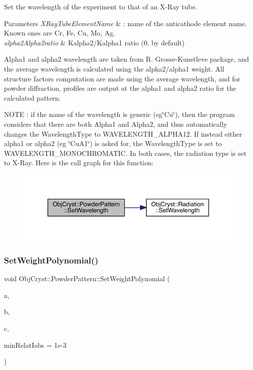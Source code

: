 Set the wavelength of the experiment to that of an X-\/\+Ray tube. 


\begin{DoxyParams}{Parameters}
{\em X\+Ray\+Tube\+Element\+Name} & \+: name of the anticathode element name. Known ones are Cr, Fe, Cu, Mo, Ag. \\
\hline
{\em alpha2\+Alpha2ratio} & Kalpha2/\+Kalpha1 ratio (0. by default)\\
\hline
\end{DoxyParams}
Alpha1 and alpha2 wavelength are taken from R. Grosse-\/\+Kunstleve package, and the average wavelength is calculated using the alpha2/alpha1 weight. All structure factors computation are made using the average wavelength, and for powder diffraction, profiles are output at the alpha1 and alpha2 ratio for the calculated pattern.

N\+O\+TE \+: if the name of the wavelength is generic (eg\char`\"{}\+Cu\char`\"{}), then the program considers that there are both Alpha1 and Alpha2, and thus automatically changes the Wavelength\+Type to W\+A\+V\+E\+L\+E\+N\+G\+T\+H\+\_\+\+A\+L\+P\+H\+A12. If instead either alpha1 or alpha2 (eg \char`\"{}\+Cu\+A1\char`\"{}) is asked for, the Wavelength\+Type is set to W\+A\+V\+E\+L\+E\+N\+G\+T\+H\+\_\+\+M\+O\+N\+O\+C\+H\+R\+O\+M\+A\+T\+IC. In both cases, the radiation type is set to X-\/\+Ray. Here is the call graph for this function\+:
\nopagebreak
\begin{figure}[H]
\begin{center}
\leavevmode
\includegraphics[width=345pt]{class_obj_cryst_1_1_powder_pattern_a9638b42f38dd82522593e1e01b6629c6_cgraph}
\end{center}
\end{figure}
\mbox{\label{class_obj_cryst_1_1_powder_pattern_a3648701bed1a9ba0b576241226e06032}} 
\subsubsection{\texorpdfstring{SetWeightPolynomial()}{SetWeightPolynomial()}}
{\footnotesize\ttfamily void Obj\+Cryst\+::\+Powder\+Pattern\+::\+Set\+Weight\+Polynomial (\begin{DoxyParamCaption}\item[{const R\+E\+AL}]{a,  }\item[{const R\+E\+AL}]{b,  }\item[{const R\+E\+AL}]{c,  }\item[{const R\+E\+AL}]{min\+Relat\+Iobs = {\ttfamily 1e-\/3} }\end{DoxyParamCaption})}

